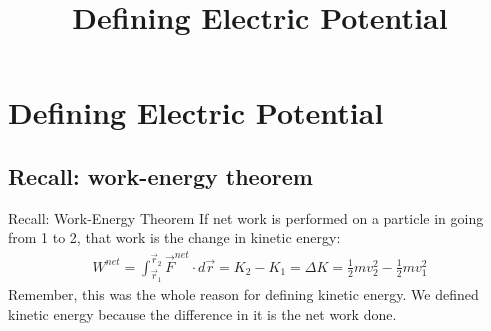 \documentclass[aspectratio=169,
hyperref={colorlinks,urlcolor=blue}
]{beamer}
\begin{document}
  {\tableofcontents[sections={49,50}, subsectionstyle=show/show]\thispagestyle{empty}}
  {\tableofcontents[sections={51}, subsectionstyle=show/show]}







\section{Defining Electric Potential}
\label{sec:definingelectricpotential}
\title{Defining Electric Potential}


\begin{frame}
\titlepage
\thispagestyle{empty}
\end{frame}




\subsection{Recall: work-energy theorem}
\label{subsec:recallworkenergytheorem}
\begin{frame}{Recall: Work-Energy Theorem}
If net work is performed on a particle in going from 1 to 2, that work is the change in kinetic energy:
\begin{align*}
W^{net}=\int_{\vec r_1}^{\vec r_2}\vec F^{net}\cdot d\vec r = K_2-K_1 = \Delta K = \frac{1}{2} m v_2^2 -\frac{1}{2}mv_1^2
\end{align*}
Remember, this was the whole reason for defining kinetic energy. We
defined kinetic energy because the difference in it is the net work done.
\end{frame}



\end{document}
